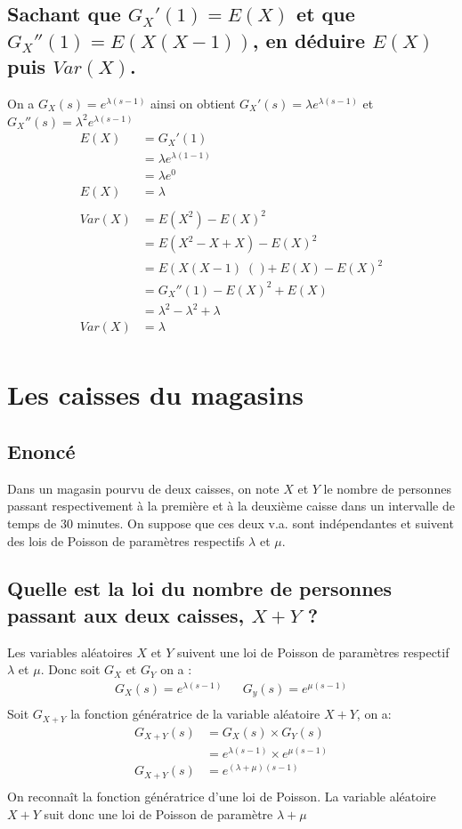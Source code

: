 \documentclass[10pt,a4paper,twoside]{article}
\begin{document}
\subsection{Sachant que $G_{X}'(1)=E(X)$ et que $G_{X}''(1)=E(X(X-1))$, en déduire $E(X)$ puis $Var(X)$.}
On a $G_{X}(s) = e^{\lambda(s-1)}$ ainsi on obtient $G_{X}'(s) =\lambda e^{\lambda(s-1)}$ et $G_{X}''(s) =\lambda^{2} e^{\lambda(s-1)}$
\begin{align*}
E(X) &= G_{X}'(1)\\
&= \lambda e^{\lambda(1-1)}\\
&= \lambda e^{0}\\
E(X) &= \lambda\\
\\
Var(X) &= E(X^{2})-E(X)^{2}\\
&= E(X^{2}-X+X)-E(X)^{2}\\
&= E\left(X(X-1)\right() + E(X) - E(X)^{2}\\
&= G_{X}''(1) - E(X)^{2} + E(X)\\
&= \lambda^{2} - \lambda^{2} + \lambda\\
Var(X) &= \lambda\\
\end{align*}

\section{Les caisses du magasins}
\subsection*{Enoncé}
Dans un magasin pourvu de deux caisses, on note $X$ et $Y$ le nombre de personnes passant respectivement à la première et à la deuxième caisse dans un intervalle de temps de 30 minutes. On suppose que ces deux v.a. sont indépendantes et suivent des lois de Poisson de paramètres respectifs $\lambda$ et $\mu$.
\subsection{Quelle est la loi du nombre de personnes passant aux deux caisses, $X+Y$ ?}
Les variables aléatoires $X$ et $Y$ suivent une loi de Poisson de paramètres respectif $\lambda$ et $\mu$. Donc soit $G_{X}$ et $G_{Y}$ on a :
\begin{align*}
G_{X}(s) = e^{\lambda(s-1)} && G_{y}(s) = e^{\mu(s-1)}\\
\end{align*}
Soit $G_{X+Y}$ la fonction génératrice de la variable aléatoire $X+Y$, on a:
\begin{align*}
G_{X+Y}(s) &= G_{X}(s) \times G_{Y}(s)\\
 &= e^{\lambda(s-1)} \times e^{\mu(s-1)}\\
G_{X+Y}(s) &= e^{(\lambda+\mu)(s-1)} \\
\end{align*}
On reconnaît la fonction génératrice d'une loi de Poisson. La variable aléatoire $X+Y$ suit donc une loi de Poisson de paramètre $\lambda+\mu$
\end{document}
